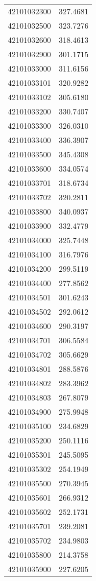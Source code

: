 \begin{longtable}[t]{lr}
42101032300 & 327.4681\\
42101032500 & 323.7276\\
42101032600 & 318.4613\\
42101032900 & 301.1715\\
42101033000 & 311.6156\\
42101033101 & 320.9282\\
42101033102 & 305.6180\\
42101033200 & 330.7407\\
42101033300 & 326.0310\\
42101033400 & 336.3907\\
42101033500 & 345.4308\\
42101033600 & 334.0574\\
42101033701 & 318.6734\\
42101033702 & 320.2811\\
42101033800 & 340.0937\\
42101033900 & 332.4779\\
42101034000 & 325.7448\\
42101034100 & 316.7976\\
42101034200 & 299.5119\\
42101034400 & 277.8562\\
42101034501 & 301.6243\\
42101034502 & 292.0612\\
42101034600 & 290.3197\\
42101034701 & 306.5584\\
42101034702 & 305.6629\\
42101034801 & 288.5876\\
42101034802 & 283.3962\\
42101034803 & 267.8079\\
42101034900 & 275.9948\\
42101035100 & 234.6829\\
42101035200 & 250.1116\\
42101035301 & 245.5095\\
42101035302 & 254.1949\\
42101035500 & 270.3945\\
42101035601 & 266.9312\\
42101035602 & 252.1731\\
42101035701 & 239.2081\\
42101035702 & 234.9803\\
42101035800 & 214.3758\\
42101035900 & 227.6205\\

\end{longtable}
